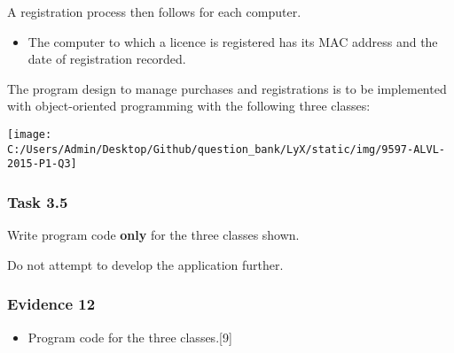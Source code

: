 A registration process then follows for each computer. 
\begin{itemize}
\item The computer to which a licence is registered has its MAC address
and the date of registration recorded. 
\end{itemize}
The program design to manage purchases and registrations is to be
implemented with object-oriented programming with the following three
classes: 
\begin{center}
\texttt{[image: C:/Users/Admin/Desktop/Github/question\_bank/LyX/static/img/9597-ALVL-2015-P1-Q3]}
\par\end{center}

\subsubsection*{Task 3.5}

Write program code \textbf{only} for the three classes shown. 

Do not attempt to develop the application further.

\subsubsection*{Evidence 12}
\begin{itemize}
\item Program code for the three classes.\hfill{}{[}9{]}
\end{itemize}